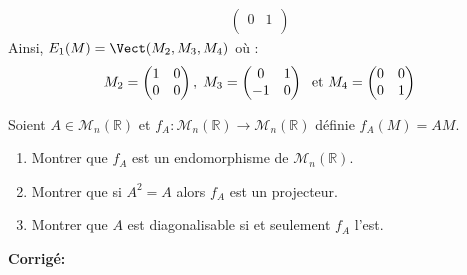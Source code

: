 \documentclass[a4paper,twoside,french,10pt]{VcCours}
\newcommand{\corr}{\textbf{Corrigé:}}
\begin{document}
\begin{enumerate}
\begin{itemize}
\begin{align*}
\begin{pmatrix}
0 & 1 \\ 
\end{pmatrix} 
\end{align*}
Ainsi, $E_1(M) = \Vect(M_2,M_3,M_4)$ où :
$$ M_2 = \begin{pmatrix} 1 & 0 \\
0 & 0 \\ 
\end{pmatrix} , \; M_3= \begin{pmatrix}
0 & 1 \\
-1 & 0
\end{pmatrix} \; \hbox{ et } M_4 = \begin{pmatrix} 0 & 0 \\
0 & 1 \\ 
\end{pmatrix}  $$
\end{itemize}
\end{enumerate}

\begin{Exercice}{} Soient $A \in \mathcal{M}_n(\mathbb{R})$ et $f_A : \mathcal{M}_n(\mathbb{R}) \rightarrow \mathcal{M}_n(\mathbb{R})$ définie $f_A(M)=AM$.

\begin{enumerate}
\item Montrer que $f_A$ est un endomorphisme de $\mathcal{M}_n(\mathbb{R})$.
\item Montrer que si $A^2=A$ alors $f_A$ est un projecteur.
\item Montrer que $A$ est diagonalisable si et seulement $f_A$ l'est.
\end{enumerate}
\end{Exercice}

\corr 
\end{document}
